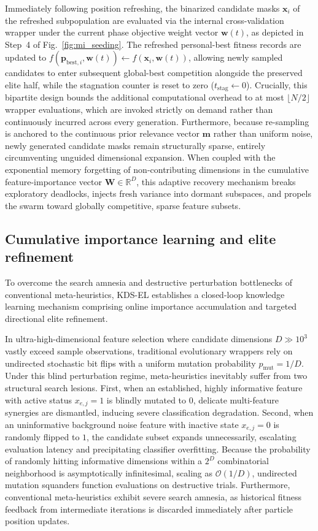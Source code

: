 Immediately following position refreshing, the binarized candidate masks $\mathbf{x}_i$ of the refreshed subpopulation are evaluated via the internal cross-validation wrapper under the current phase objective weight vector $\mathbf{w}(t)$, as depicted in Step~4 of Fig.~\ref{fig:mi_seeding}. The refreshed personal-best fitness records are updated to $f(\mathbf{p}_{\mathrm{best},i}, \mathbf{w}(t)) \leftarrow f(\mathbf{x}_i, \mathbf{w}(t))$, allowing newly sampled candidates to enter subsequent global-best competition alongside the preserved elite half, while the stagnation counter is reset to zero ($t_{\mathrm{stag}} \leftarrow 0$). Crucially, this bipartite design bounds the additional computational overhead to at most $\lfloor N/2 \rfloor$ wrapper evaluations, which are invoked strictly on demand rather than continuously incurred across every generation. Furthermore, because re-sampling is anchored to the continuous prior relevance vector $\mathbf{m}$ rather than uniform noise, newly generated candidate masks remain structurally sparse, entirely circumventing unguided dimensional expansion. When coupled with the exponential memory forgetting of non-contributing dimensions in the cumulative feature-importance vector $\mathbf{W} \in \mathbb{R}^D$, this adaptive recovery mechanism breaks exploratory deadlocks, injects fresh variance into dormant subspaces, and propels the swarm toward globally competitive, sparse feature subsets.

\subsection{Cumulative importance learning and elite refinement}\label{sec:importance}\label{sec:ker}

To overcome the search amnesia and destructive perturbation bottlenecks of conventional meta-heuristics, KDS-EL establishes a closed-loop knowledge learning mechanism comprising online importance accumulation and targeted directional elite refinement.

In ultra-high-dimensional feature selection where candidate dimensions $D \gg 10^3$ vastly exceed sample observations, traditional evolutionary wrappers rely on undirected stochastic bit flips with a uniform mutation probability $p_{\mathrm{mut}} = 1/D$. Under this blind perturbation regime, meta-heuristics inevitably suffer from two structural search lesions. First, when an established, highly informative feature with active status $x_{e,j} = 1$ is blindly mutated to $0$, delicate multi-feature synergies are dismantled, inducing severe classification degradation. Second, when an uninformative background noise feature with inactive state $x_{e,j} = 0$ is randomly flipped to $1$, the candidate subset expands unnecessarily, escalating evaluation latency and precipitating classifier overfitting. Because the probability of randomly hitting informative dimensions within a $2^D$ combinatorial neighborhood is asymptotically infinitesimal, scaling as $\mathcal{O}(1/D)$, undirected mutation squanders function evaluations on destructive trials. Furthermore, conventional meta-heuristics exhibit severe search amnesia, as historical fitness feedback from intermediate iterations is discarded immediately after particle position updates.

